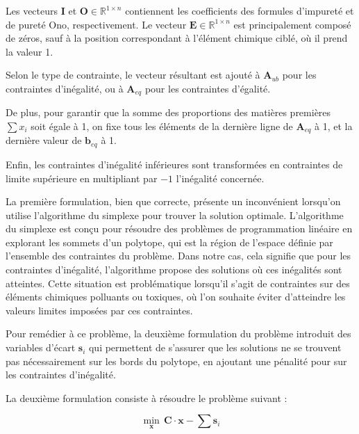 \documentclass[12pt]{article}
\begin{document}
Les vecteurs $\mathbf{I}$ et $\mathbf{O} \in \mathbb{R}^{1 \times n}$ 
contiennent les coefficients des formules d'impureté et de pureté Ono, 
respectivement. Le vecteur $\mathbf{E} \in \mathbb{R}^{1 \times n}$ est 
principalement composé de zéros, sauf à la position correspondant à 
l'élément chimique ciblé, où il prend la valeur 1.

Selon le type de contrainte, le vecteur résultant est ajouté à 
$\mathbf{A}_{ub}$ pour les contraintes d'inégalité, ou à $\mathbf{A}_{eq}$ 
pour les contraintes d'égalité.

De plus, pour garantir que la somme des proportions des matières premières 
$\sum x_i$ soit égale à 1, on fixe tous les éléments de la dernière ligne 
de $\mathbf{A}_{eq}$ à 1, et la dernière valeur de $\mathbf{b}_{eq}$ à 1.

Enfin, les contraintes d'inégalité inférieures sont transformées en 
contraintes de limite supérieure en multipliant par $-1$ l'inégalité 
concernée.








La première formulation, bien que correcte, présente un inconvénient 
lorsqu'on utilise l'algorithme du simplexe pour trouver la solution 
optimale. 
L'algorithme du simplexe est conçu pour résoudre des problèmes de 
programmation linéaire en explorant les sommets d'un polytope, qui est 
la région de l'espace définie par l'ensemble des contraintes du problème.
Dans notre cas, cela signifie que pour les contraintes d'inégalité, 
l'algorithme propose des solutions où ces inégalités
sont atteintes. Cette situation est problématique lorsqu'il 
s'agit de contraintes sur des éléments chimiques polluants ou toxiques, 
où l'on souhaite éviter d'atteindre les valeurs limites imposées par ces 
contraintes.



Pour remédier à ce problème, la deuxième formulation du 
problème introduit des variables d'écart $\mathbf{s}_i$
qui permettent de s'assurer que les solutions ne se trouvent pas 
nécessairement sur les bords du polytope, en ajoutant une pénalité pour 
sur les contraintes d'inégalité.



La deuxième formulation consiste à résoudre le problème suivant :

\[
\underset{\mathbf{x}}{\min} \, \mathbf{C} \cdot \mathbf{x} - \sum \mathbf{s}_i
\]
\end{document}

